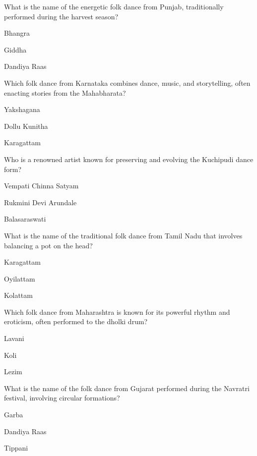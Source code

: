 
\begin{enhancedmcq}{What is the name of the energetic folk dance from Punjab, traditionally performed during the harvest season?}
\item Bhangra
\item Giddha
\item Dandiya Raas

\end{enhancedmcq}
\begin{enhancedmcq}{Which folk dance from Karnataka combines dance, music, and storytelling, often enacting stories from the Mahabharata?}
\item Yakshagana
\item Dollu Kunitha
\item Karagattam

\end{enhancedmcq}
\begin{enhancedmcq}{Who is a renowned artist known for preserving and evolving the Kuchipudi dance form?}
\item Vempati Chinna Satyam
\item Rukmini Devi Arundale
\item Balasaraswati

\end{enhancedmcq}
\begin{enhancedmcq}{What is the name of the traditional folk dance from Tamil Nadu that involves balancing a pot on the head?}
\item Karagattam
\item Oyilattam
\item Kolattam

\end{enhancedmcq}
\begin{enhancedmcq}{Which folk dance from Maharashtra is known for its powerful rhythm and eroticism, often performed to the dholki drum?}
\item Lavani
\item Koli
\item Lezim

\end{enhancedmcq}
\begin{enhancedmcq}{What is the name of the folk dance from Gujarat performed during the Navratri festival, involving circular formations?}
\item Garba
\item Dandiya Raas
\item Tippani

\end{enhancedmcq}

